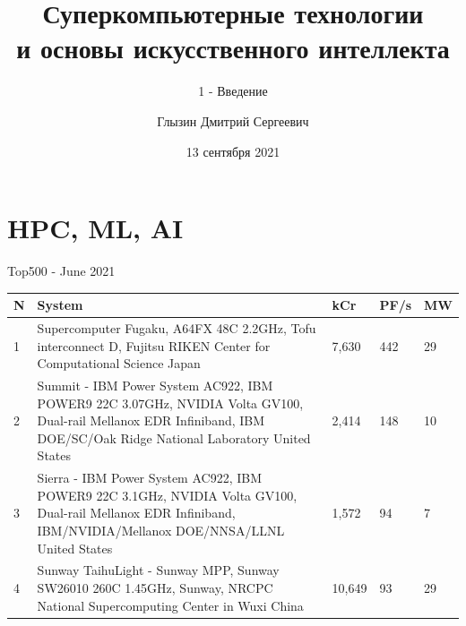 \documentclass{beamer}
\title{Суперкомпьютерные технологии \\и основы искусственного интеллекта}
\subtitle{1 - Введение}
\author{Глызин Дмитрий Сергеевич}
\institute{Ярославский государственный \\университет им. П.Г. Демидова}
\date{13 сентября 2021}
\begin{document}

\begin{frame}
	\maketitle %
\end{frame}


\section{HPC, ML, AI} %



\begin{frame}{Top500 - June 2021}
	\begin{table}
		\centering %
\small		
                \begin{tabular}{p{0.1cm} p{8cm} p{0.7cm} p{0.5cm} p{0.5cm}}

			N  &  System & kCr & PF/s & MW\\
			\toprule
			1 &   Supercomputer Fugaku, A64FX 48C 2.2GHz, Tofu interconnect D, Fujitsu 
RIKEN Center for Computational Science Japan &  7,630 & 442 &29\\
			\midrule
			 2 &    Summit - IBM Power System AC922, IBM POWER9 22C 3.07GHz, NVIDIA Volta GV100, Dual-rail Mellanox EDR Infiniband, IBM
DOE/SC/Oak Ridge National Laboratory United States   & 2,414 & 148 &10\\
			\midrule
                            3 &  Sierra - IBM Power System AC922, IBM POWER9 22C 3.1GHz, NVIDIA Volta GV100, Dual-rail Mellanox EDR Infiniband, IBM/NVIDIA/Mellanox DOE/NNSA/LLNL United States  & 1,572 & 94 & 7 \\
			\midrule
			4 &   Sunway TaihuLight - Sunway MPP, Sunway SW26010 260C 1.45GHz, Sunway, NRCPC National Supercomputing Center in Wuxi
			China  &  10,649 & 93 &29\\
		\end{tabular}
	\end{table}
\end{frame}
\end{document}

